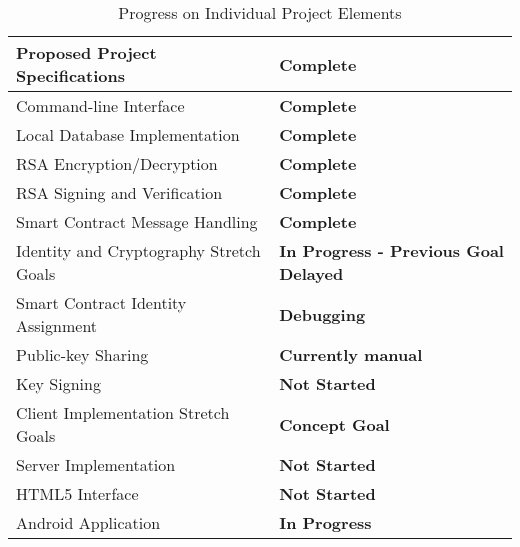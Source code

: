 \documentclass[titlepage]{report}
\begin{document}
\begin{table}[ht]
\begin{center}
\caption{Progress on Individual Project Elements}
\begin{tabular}{| l | p{5cm} |}
\hline
Proposed Project Specifications & \textbf{Complete} \\
\hline
Command-line Interface & \textbf{Complete} \\
Local Database Implementation & \textbf{Complete} \\
RSA\index{RSA} Encryption/Decryption & \textbf{Complete} \\
RSA\index{RSA} Signing and Verification & \textbf{Complete} \\
Smart Contract Message Handling & \textbf{Complete} \\
\hline
Identity and Cryptography Stretch Goals & \textbf{In Progress - Previous Goal Delayed} \\
\hline
Smart Contract Identity Assignment & \textbf{Debugging} \\
Public-key Sharing & \textbf{Currently manual} \\
Key Signing & \textbf{Not Started} \\
\hline
Client Implementation Stretch Goals & \textbf{Concept Goal} \\
\hline
Server Implementation & \textbf{Not Started} \\
HTML5 Interface & \textbf{Not Started} \\
Android Application & \textbf{In Progress} \\
\hline
\end{tabular}
\end{center}
\end{table}

\listoftables
\printindex
\printglossaries{}
\printbibliography{}
\end{document}

